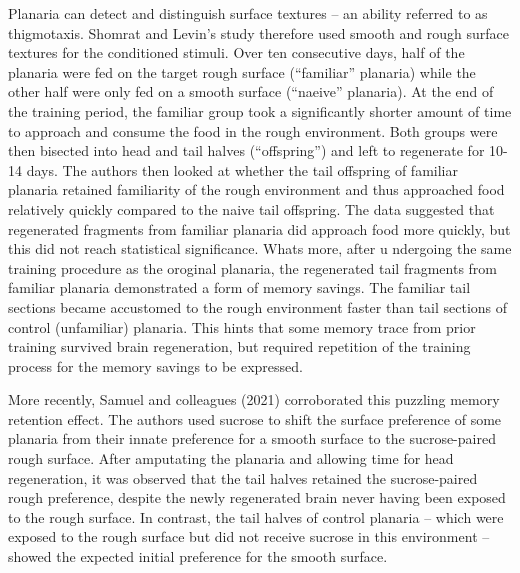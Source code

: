 \documentclass[
  letterpaper,
  DIV=11,
  numbers=noendperiod,
  oneside]{scrartcl}
\begin{document}
Planaria can detect and distinguish surface textures -- an ability
referred to as thigmotaxis. Shomrat and Levin's study therefore used
smooth and rough surface textures for the conditioned stimuli. Over ten
consecutive days, half of the planaria were fed on the target rough
surface (``familiar'' planaria) while the other half were only fed on a
smooth surface (``naeive'' planaria). At the end of the training period,
the familiar group took a significantly shorter amount of time to
approach and consume the food in the rough environment. Both groups were
then bisected into head and tail halves (``offspring'') and left to
regenerate for 10-14 days. The authors then looked at whether the tail
offspring of familiar planaria retained familiarity of the rough
environment and thus approached food relatively quickly compared to the
naive tail offspring. The data suggested that regenerated fragments from
familiar planaria did approach food more quickly, but this did not reach
statistical significance. Whats more, after u ndergoing the same
training procedure as the oroginal planaria, the regenerated tail
fragments from familiar planaria demonstrated a form of memory savings.
The familiar tail sections became accustomed to the rough environment
faster than tail sections of control (unfamiliar) planaria. This hints
that some memory trace from prior training survived brain regeneration,
but required repetition of the training process for the memory savings
to be expressed.

More recently, Samuel and colleagues (2021) corroborated this puzzling
memory retention effect. The authors used sucrose to shift the surface
preference of some planaria from their innate preference for a smooth
surface to the sucrose-paired rough surface. After amputating the
planaria and allowing time for head regeneration, it was observed that
the tail halves retained the sucrose-paired rough preference, despite
the newly regenerated brain never having been exposed to the rough
surface. In contrast, the tail halves of control planaria -- which were
exposed to the rough surface but did not receive sucrose in this
environment -- showed the expected initial preference for the smooth
surface.
\end{document}
